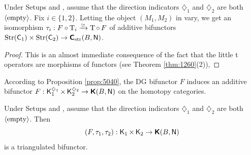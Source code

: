 \begin{lem} \label{lem:2015}
Under Setups \tup{\ref{set:3231}} and \tup{\ref{set:3230}}, assume that 
the direction indicators $\diamondsuit_1$ and $\diamondsuit_2$ are both
$\langle \mathrm{empty} \rangle$. Fix $i \in \{ 1, 2 \}$.
Letting the object $(M_1, M_2)$ in \tup{(\ref{eqn:2015})} vary, we get an 
isomorphism 
$\tau_i : F \circ \operatorname{T}_i \xrightarrow{\simeq} \operatorname{T} \circ \, F$
of additive bifunctors 
$\operatorname{Str}(\operatorname{\mathsf{C}}_{1}) \times \operatorname{Str}(\operatorname{\mathsf{C}}_{2}) \to
\boldsymbol{\mathsf{C}}_{\mathrm{str}}(B, \operatorname{\mathsf{N}})$.
\end{lem}

\begin{proof}
This is an almost immediate consequence of the fact that the little 
t operators are morphisms of functors (see Theorem \ref{thm:1260}(2)),
\end{proof}

According to Proposition \ref{prop:5040}, the DG bifunctor $F$ induces an 
additive bifunctor 
$F : \operatorname{\mathsf{K}}_{1}^{\diamondsuit_1} \times \operatorname{\mathsf{K}}_{2}^{\diamondsuit_2} \to 
\boldsymbol{\mathsf{K}}(B, \operatorname{\mathsf{N}})$ 
on the homotopy categories. 

\begin{lem} \label{lem:4225}    
Under Setups \tup{\ref{set:3231}} and \tup{\ref{set:3230}}, assume that 
the direction indicators $\diamondsuit_1$ and $\diamondsuit_2$ are both
$\langle \mathrm{empty} \rangle$. Then 
\[ (F, \tau_1, \tau_2) :  \operatorname{\mathsf{K}}_1 \times \operatorname{\mathsf{K}}_2 \to 
\boldsymbol{\mathsf{K}}(B, \operatorname{\mathsf{N}}) \]
is a triangulated bifunctor. 
\end{lem}

